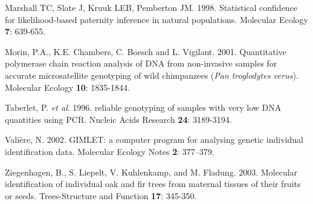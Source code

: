 \documentclass[a4paper,12pt]{article}
\begin{document}
\begin{thebibliography}{1}
Marshall TC, Slate J, Kruuk LEB, Pemberton JM. 1998. Statistical confidence for likelihood-based paternity inference in natural 
populations. Molecular Ecology \textbf{7}: 639-655.

Morin, P.A., K.E. Chambers, C. Boesch and L. Vigilant. 2001. 
Quantitative polymerase chain reaction analysis of DNA from non-invasive 
samples for accurate microsatellite genotyping of wild chimpanzees 
(\textit{Pan troglodytes verus}). Molecular Ecology \textbf{10}: 1835-1844.

Taberlet, P. \textit{et al}. 1996. reliable genotyping of samples with very low DNA quantities using PCR. Nucleic Acids Research \textbf{24}: 3189-3194.

Vali\`{e}re, N. 2002. GIMLET: a computer program for analysing 
genetic individual identification data. Molecular Ecology Notes \textbf{2}: 377--379.

Ziegenhagen, B., S. Liepelt, V. Kuhlenkamp, and M. Fladung. 2003. Molecular identification of individual oak and fir trees from maternal tissues of their fruits or seeds. Trees-Structure and Function \textbf{17}: 345-350.

\end{thebibliography}

\end{document}
